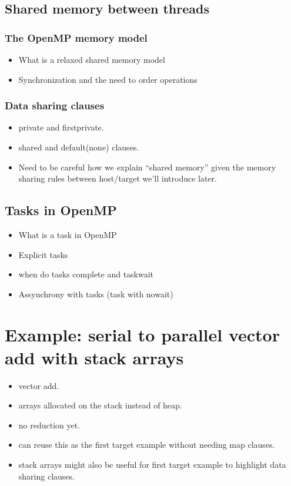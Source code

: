 \subsection{Shared memory between threads}
\subsubsection{The OpenMP memory model}
\begin{itemize}
  \item What is a relaxed shared memory model
  \item Synchronization and the need to order operations
\end{itemize}
\subsubsection{Data sharing clauses}
\begin{itemize}
  \item private and firstprivate.
  \item shared and default(none) clauses.
  \item Need to be careful how we explain “shared memory” given the memory sharing rules between host/target we’ll introduce later.
\end{itemize}

\subsection{Tasks in OpenMP}
\begin{itemize}
   \item What is a task in OpenMP
   \item Explicit tasks 
   \item when do tasks complete and taskwait
   \item Assynchrony with tasks (task with nowait)
\end{itemize}

\section{Example: serial to parallel vector add with stack arrays}
\begin{itemize}
  \item vector add.
  \item arrays allocated on the stack instead of heap.
  \item no reduction yet.
  \item can reuse this as the first target example without needing map clauses.
  \item stack arrays might also be useful for first target example to highlight data sharing clauses.
\end{itemize}

